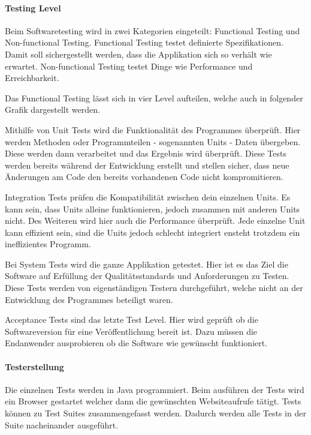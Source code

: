 \paragraph{Testing Level}
Beim Softwaretesting wird in zwei Kategorien eingeteilt: Functional Testing und Non-functional Testing. Functional Testing testet definierte Spezifikationen. Damit soll sichergestellt werden, dass die Applikation sich so verhält wie erwartet. Non-functional Testing testet Dinge wie Performance und Erreichbarkeit.\cite{TESTING1}

Das Functional Testing lässt sich in vier Level aufteilen, welche auch in folgender Grafik dargestellt werden.


Mithilfe von Unit Tests wird die Funktionalität des Programmes überprüft. Hier werden Methoden oder Programmteilen - sogenannten Units - Daten übergeben. Diese werden dann verarbeitet und das Ergebnis wird überprüft. Diese Tests werden bereits während der Entwicklung erstellt und stellen sicher, dass neue Änderungen am Code den bereits vorhandenen Code nicht kompromitieren. \cite{TESTING3}

Integration Tests prüfen die Kompatibilität zwischen dein einzelnen Units. Es kann sein, dass Units alleine funktionieren, jedoch zusammen mit anderen Units nicht. Des Weiteren wird hier auch die Performance überprüft. Jede einzelne Unit kann effizient sein, sind die Units jedoch schlecht integriert ensteht trotzdem ein ineffizientes Programm. \cite{TESTING3}

\newpage

Bei System Tests wird die ganze Applikation getestet. Hier ist es das Ziel die Software auf  Erfüllung der Qualitätsstandards und Anforderungen zu Testen. Diese Tests werden von eigenständigen Testern durchgeführt, welche nicht an der Entwicklung des Programmes beteiligt waren. \cite{TESTING3}

Acceptance Tests sind das letzte Test Level. Hier wird geprüft ob die Softwareversion für eine Veröffentlichung bereit ist. Dazu müssen die Endanwender ausprobieren ob die Software wie gewünscht funktioniert. \cite{TESTING3}

\paragraph{Testerstellung}
Die einzelnen Tests werden in Java programmiert. Beim ausführen der Tests wird ein Browser gestartet welcher dann die gewünschten Websiteaufrufe tätigt. Tests können zu Test Suites zusammengefasst werden. Dadurch werden alle Tests in der Suite nacheinander ausgeführt. 

